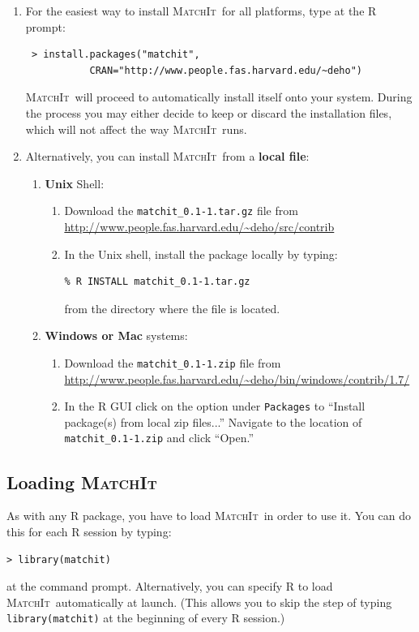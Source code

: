 \documentclass[oneside,letterpaper,titlepage]{article}
\newcommand{\MatchIt}{\textsc{MatchIt}}
\begin{document}
\begin{enumerate} 
\item For the easiest way to install \MatchIt\ for all platforms,
  type at the R prompt:
\begin{verbatim}
 > install.packages("matchit", 
           CRAN="http://www.people.fas.harvard.edu/~deho")
\end{verbatim}

  \noindent \MatchIt\ will proceed to automatically install itself onto
  your system.  During the process you may either decide to keep or
  discard the installation files, which will not affect the way
  \MatchIt\ runs.

\item Alternatively, you can install \MatchIt\ from a \textbf{local file}:
  \begin{enumerate} 
  \item \textbf{Unix} Shell:
    \begin{enumerate}
    \item Download the \texttt{matchit\_0.1-1.tar.gz} file from
      \url{http://www.people.fas.harvard.edu/~deho/src/contrib}
    \item In the Unix shell, install the package locally by typing:
\begin{verbatim}
% R INSTALL matchit_0.1-1.tar.gz   
\end{verbatim}
      from the directory where the file is located.
    \end{enumerate}
  \item \textbf{Windows or Mac} systems:
    \begin{enumerate}
    \item Download the \texttt{matchit\_0.1-1.zip} file from 
      \url{http://www.people.fas.harvard.edu/~deho/bin/windows/contrib/1.7/}
    \item In the R GUI click on the option under \texttt{Packages}
      to ``Install package(s) from local zip files...''
      Navigate to the location of \texttt{matchit\_0.1-1.zip} and click ``Open.''
    \end{enumerate}
  \end{enumerate}
\end{enumerate}

\subsection{Loading \MatchIt}
As with any R package, you have to load \MatchIt\ in order to use it.
You can do this for each R session by typing:
\begin{verbatim}
> library(matchit) 
\end{verbatim}
at the command prompt.  Alternatively, you can specify R to load
\MatchIt\ automatically at launch.  (This allows you to skip the step
of typing {\tt library(matchit)} at the beginning of every R session.)
 
\end{document}
